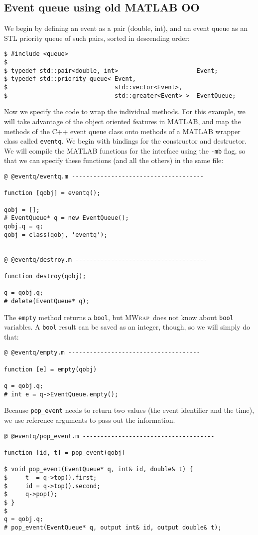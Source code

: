 \documentclass[12pt]{article}
\newcommand{\mwrap}{\textsc{MWrap}}
\begin{document}
\subsection{Event queue using old MATLAB OO}

We begin by defining an event as a pair (double, int), and an
event queue as an STL priority queue of such pairs, sorted in
descending order:
\begin{verbatim}
$ #include <queue>
$
$ typedef std::pair<double, int>                      Event;
$ typedef std::priority_queue< Event,
$                              std::vector<Event>,
$                              std::greater<Event> >  EventQueue;
\end{verbatim}

Now we specify the code to wrap the individual methods.  For this
example, we will take advantage of the object oriented features in
MATLAB, and map the methods of the C++ event queue class onto methods
of a MATLAB wrapper class called {\tt eventq}.  We begin with bindings
for the constructor and destructor.  We will compile the MATLAB
functions for the interface using the {\tt -mb} flag, so that we can
specify these functions (and all the others) in the same file:
\begin{verbatim}
@ @eventq/eventq.m -------------------------------------

function [qobj] = eventq();

qobj = [];
# EventQueue* q = new EventQueue();
qobj.q = q;
qobj = class(qobj, 'eventq');


@ @eventq/destroy.m -------------------------------------

function destroy(qobj);

q = qobj.q;
# delete(EventQueue* q);
\end{verbatim}

The {\tt empty} method returns a {\tt bool}, but \mwrap\ does not
know about {\tt bool} variables.  A {\tt bool} result can be saved
as an integer, though, so we will simply do that:
\begin{verbatim}
@ @eventq/empty.m -------------------------------------

function [e] = empty(qobj)

q = qobj.q;
# int e = q->EventQueue.empty();
\end{verbatim}

Because {\tt pop\_event} needs to return two values (the event identifier
and the time), we use reference arguments to pass out the information.
\begin{verbatim}
@ @eventq/pop_event.m -------------------------------------

function [id, t] = pop_event(qobj)

$ void pop_event(EventQueue* q, int& id, double& t) {
$     t  = q->top().first;
$     id = q->top().second;
$     q->pop();
$ }
$
q = qobj.q;
# pop_event(EventQueue* q, output int& id, output double& t);
\end{verbatim}
\end{document}
